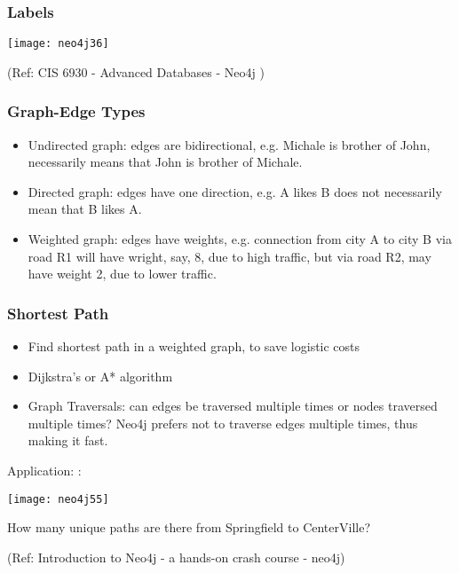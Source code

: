 \begin{frame}\frametitle{Labels}


\begin{center}
\texttt{[image: neo4j36]}
\end{center}	

{\tiny (Ref: CIS 6930 - Advanced Databases - Neo4j )}
\end{frame}


\begin{frame}\frametitle{Graph-Edge Types}

\begin{itemize}
\item Undirected graph: edges are bidirectional, e.g. Michale is brother of John, necessarily means that John is brother of Michale.
\item Directed graph: edges have one direction, e.g. A likes B does not necessarily mean that B likes A.
\item Weighted graph: edges have weights, e.g. connection from city A to city B via road R1 will have wright, say, 8, due to high traffic, but via road R2, may have weight 2, due to lower traffic.
\end{itemize}

\end{frame}

\begin{frame}\frametitle{Shortest Path}

\begin{itemize}
\item Find shortest path in a weighted graph, to save logistic costs
\item Dijkstra's or A* algorithm
\item Graph Traversals: can edges be traversed multiple times or nodes traversed multiple times? Neo4j prefers not to traverse edges multiple times, thus making it fast.
\end{itemize}

Application: :
\begin{center}
\texttt{[image: neo4j55]}
\end{center}	

How many unique paths are there from Springfield to CenterVille?

{\tiny (Ref: Introduction to Neo4j - a hands-on crash course - neo4j)}
\end{frame}

